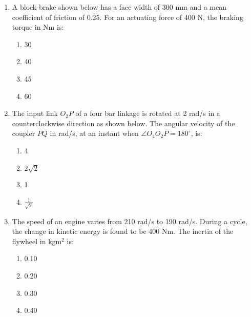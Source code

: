 \documentclass[journal,9pt,onecolumn]{IEEEtran}
\begin{document}
\begin{enumerate}
\item A block-brake shown below has a face width of 300 mm and a mean coefficient of friction of 0.25. For an actuating force of 400 N, the braking torque in Nm is:
    \begin{center}
    
     \end{center}
\begin{multicols}{4}
\begin{enumerate}
    \item 30
    \item 40
    \item 45
    \item 60
\end{enumerate}
\end{multicols}

\item  The input link $O_2P$ of a four bar linkage is rotated at 2 rad/s in a counterclockwise direction as shown below. The angular velocity of the coupler $PQ$ in rad/s, at an instant when $\angle O_4O_2P = 180^\circ$, is:
    \begin{center}

 \end{center}
\begin{multicols}{4}
\begin{enumerate}
    \item 4
    \item $2\sqrt{2}$
    \item 1
    \item $\frac{1}{\sqrt{2}}$
    \end{enumerate}
\end{multicols}

\item  The speed of an engine varies from 210 rad/s to 190 rad/s. During a cycle, the change in kinetic energy is found to be 400 Nm. The inertia of the flywheel in kgm$^2$ is:
\begin{multicols}{4}
\begin{enumerate}
    \item 0.10
    \item 0.20
    \item 0.30
    \item 0.40
\end{enumerate}
\end{multicols}

\end{enumerate}
\end{document}
